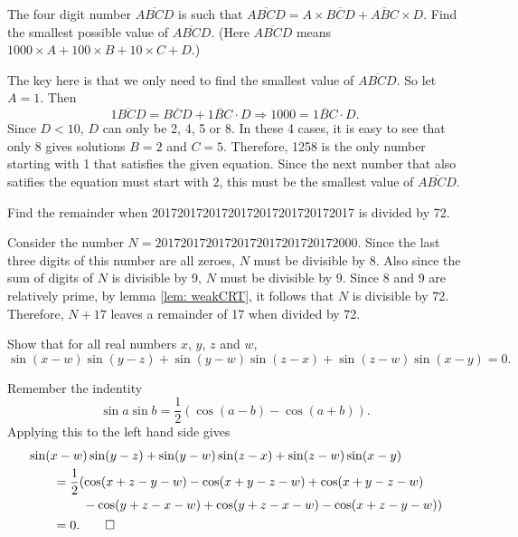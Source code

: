 \begin{question}
    The four digit number $\overline{ABCD}$ is such that $\overline{ABCD} = A
    \times \overline{BCD} + \overline{ABC} \times D$. Find the smallest
    possible value of $\overline{ABCD}$. (Here $\overline{ABCD}$ means $1000
    \times A + 100 \times B + 10 \times C + D$.)
\end{question}
\begin{solution}
    The key here is that we only need to find the smallest value of
    $\overline{ABCD}$. So let $A = 1$. Then
    \[ \overline{1BCD} = \overline{BCD} + \overline{1BC} \cdot D \Longrightarrow 1000 = \overline{1BC} \cdot D. \]
    Since $D < 10$, $D$ can only be 2, 4, 5 or 8. In these 4 cases, it is easy
    to see that only 8 gives solutions $B = 2$ and $C = 5$. Therefore, 1258 is
    the only number starting with 1 that satisfies the given equation. Since
    the next number that also satifies the equation must start with 2, this
    must be the smallest value of $\overline{ABCD}$.  
\end{solution}

\begin{question}
    Find the remainder when 20172017201720172017201720172017 is divided by 72.
\end{question}
\begin{solution}
    Consider the number $N = 20172017201720172017201720172000$. Since the last
    three digits of this number are all zeroes, $N$ must be divisible by 8.
    Also since the sum of digits of $N$ is divisible by 9, $N$ must be
    divisible by 9. Since 8 and 9 are relatively prime, by lemma \ref{lem:
    weakCRT}, it follows that $N$ is divisible by 72. Therefore, $N + 17$
    leaves a remainder of 17 when divided by 72.
\end{solution}

\begin{question}
    Show that for all real numbers $x$, $y$, $z$ and $w$, 
    \[\sin(x - w)\sin(y - z) + \sin(y - w)\sin(z - x) + \sin(z - w)\sin(x - y) = 0.\]
\end{question}
\begin{solution}
    Remember the indentity
    \[ \sin a \sin b = \frac{1}{2}(\cos (a - b) - \cos (a + b)). \]
    Applying this to the left hand side gives
    \begin{align*}
        \MoveEqLeft
    \sin(x - w)\sin(y - z) + \sin(y - w)\sin(z - x) + \sin(z - w)\sin(x - y)\\
        & = \begin{multlined}[t] 
            \frac{1}{2}(\cos(x + z - y - w) - \cos(x + y - z - w) + \cos (x + y - z - w)\\
            - \cos(y + z - x - w) + \cos(y + z - x - w) - \cos(x + z - y - w))
            \end{multlined}\\
        & = 0. \qedhere
    \end{align*}
\end{solution}

